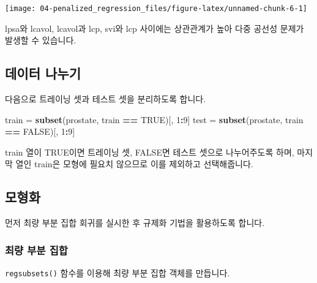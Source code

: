 \documentclass[12pt,]{book}
\newenvironment{Shaded}{\begin{snugshade}}{\end{snugshade}}
\newcommand{\DataTypeTok}[1]{\textcolor[rgb]{0.13,0.29,0.53}{#1}}
\newcommand{\DecValTok}[1]{\textcolor[rgb]{0.00,0.00,0.81}{#1}}
\newcommand{\KeywordTok}[1]{\textcolor[rgb]{0.13,0.29,0.53}{\textbf{#1}}}
\newcommand{\NormalTok}[1]{#1}
\newcommand{\OperatorTok}[1]{\textcolor[rgb]{0.81,0.36,0.00}{\textbf{#1}}}
\newcommand{\OtherTok}[1]{\textcolor[rgb]{0.56,0.35,0.01}{#1}}
\newcommand{\StringTok}[1]{\textcolor[rgb]{0.31,0.60,0.02}{#1}}
\begin{document}
\begin{center}\texttt{[image: 04-penalized\_regression\_files/figure-latex/unnamed-chunk-6-1]} \end{center}

lpsa와 lcavol, lcavol과 lcp, svi와 lcp 사이에는 상관관계가 높아 다중 공선성 문제가 발생할 수 있습니다.

\hypertarget{uxb370uxc774uxd130-uxb098uxb204uxae30-1}{%
\subsection{데이터 나누기}\label{uxb370uxc774uxd130-uxb098uxb204uxae30-1}}

다음으로 트레이닝 셋과 테스트 셋을 분리하도록 합니다.

\begin{Shaded}
\begin{Highlighting}[]
\NormalTok{train =}\StringTok{ }\KeywordTok{subset}\NormalTok{(prostate, train }\OperatorTok{==}\StringTok{ }\OtherTok{TRUE}\NormalTok{)[, }\DecValTok{1}\OperatorTok{:}\DecValTok{9}\NormalTok{]}
\NormalTok{test =}\StringTok{ }\KeywordTok{subset}\NormalTok{(prostate, train }\OperatorTok{==}\StringTok{ }\OtherTok{FALSE}\NormalTok{)[, }\DecValTok{1}\OperatorTok{:}\DecValTok{9}\NormalTok{]}
\end{Highlighting}
\end{Shaded}

train 열이 TRUE이면 트레이닝 셋, FALSE면 테스트 셋으로 나누어주도록 하며, 마지막 열인 train은 모형에 필요치 않으므로 이를 제외하고 선택해줍니다.

\hypertarget{uxbaa8uxd615uxd654-1}{%
\subsection{모형화}\label{uxbaa8uxd615uxd654-1}}

먼저 최량 부분 집합 회귀를 실시한 후 규제화 기법을 활용하도록 합니다.

\hypertarget{uxcd5cuxb7c9-uxbd80uxbd84-uxc9d1uxd569}{%
\subsubsection{최량 부분 집합}\label{uxcd5cuxb7c9-uxbd80uxbd84-uxc9d1uxd569}}

\texttt{regsubsets()} 함수를 이용해 최량 부분 집합 객체를 만듭니다.

\begin{Shaded}
\end{Shaded}
\end{document}
